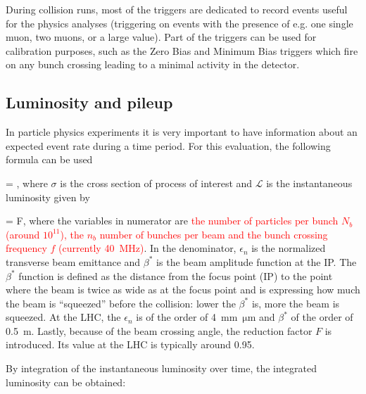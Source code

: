 
During collision runs, most of the triggers are dedicated to record events useful for the physics analyses (triggering on events with the presence of e.g. one single muon, two muons, or a large \MET value). Part of the triggers can be used for calibration purposes, such as the Zero Bias and Minimum Bias triggers which fire on any bunch crossing leading to a minimal activity in the detector.

\subsection{Luminosity and pileup}

In particle physics experiments it is very important to have information about an expected event rate during a time period. For this evaluation, the following formula can be used

{
  = \sigma \times {},
}
where $\sigma$ is the cross section of process of interest and $\mathcal{L}$ is the instantaneous luminosity given by

{
  = F,
}
where the variables in numerator are \textcolor{red}{the number of particles per bunch $N_{b}$ (around $10^{11}$), the $n_{b}$ number of bunches per beam and the bunch crossing frequency $f$ (currently 40~MHz)}. In the denominator, $\epsilon_{n}$ is the normalized transverse beam emittance and $\beta^{*}$ is the beam amplitude function at the IP. The $\beta^{*}$ function  is defined as the distance from the focus point (IP) to the point where the beam is twice as wide as at the focus point and is expressing how much the beam is ``squeezed'' before the collision: lower the $\beta^{*}$ is, more  the beam is squeezed. At the LHC, the  $\epsilon_{n}$ is of the order of 4~mm~$\mathrm{\mu m}$ and $\beta^{*}$ of the order of 0.5~m. Lastly, because of the beam crossing angle, the reduction factor $F$ is introduced. Its value at the LHC is typically around 0.95.

By integration of the instantaneous luminosity over time, the integrated luminosity can be obtained:

